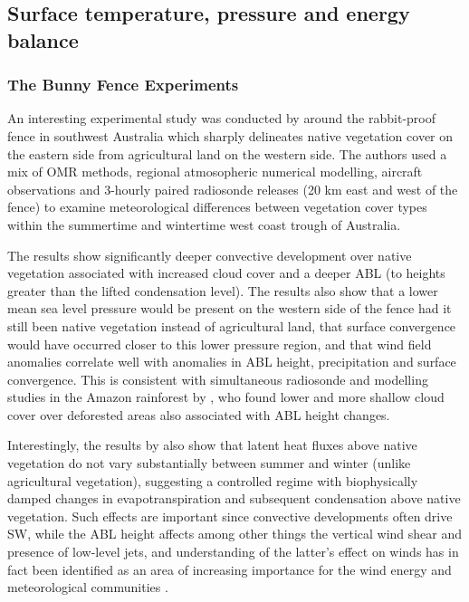 \subsection{Surface temperature, pressure and energy balance}

\subsubsection{The Bunny Fence Experiments}

An interesting experimental study was conducted by \citet{nair2011} around the rabbit-proof fence in southwest Australia which sharply delineates native vegetation cover on the eastern side from agricultural land on the western side. The authors used a mix of \ac{OMR} methods, regional atmosopheric numerical modelling, aircraft observations and 3-hourly paired radiosonde releases (20 km east and west of the fence) to examine meteorological differences between vegetation cover types within the summertime and wintertime west coast trough of Australia.

The results show significantly deeper convective development over native vegetation associated with increased cloud cover and a deeper \ac{ABL} (to heights greater than the lifted condensation level). The results also show that a lower mean sea level pressure would be present on the western side of the fence had it still been native vegetation instead of agricultural land, that surface convergence would have occurred closer to this lower pressure region, and that wind field anomalies correlate well with anomalies in \ac{ABL} height, precipitation and surface convergence. This is consistent with simultaneous radiosonde and modelling studies in the Amazon rainforest by \citet{wang2009, xu2022}, who found lower and more shallow cloud cover over deforested areas also associated with \ac{ABL} height changes. 

Interestingly, the results by \citet{nair2011} also show that latent heat fluxes above native vegetation do not vary substantially between summer and winter (unlike agricultural vegetation), suggesting a controlled regime with biophysically damped changes in evapotranspiration and subsequent condensation above native vegetation. Such effects are important since convective developments often drive \ac{SW}, while the \ac{ABL} height affects among other things the vertical wind shear and presence of low-level jets, and understanding of the latter’s effect on winds has in fact been identified as an area of increasing importance for the wind energy and meteorological communities \citep{pena2013}.


